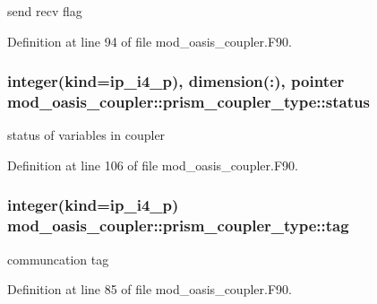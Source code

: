 send recv flag 



Definition at line 94 of file mod\+\_\+oasis\+\_\+coupler.\+F90.

\hypertarget{structmod__oasis__coupler_1_1prism__coupler__type_aee26373fa4a84f3c4e1841ba702f161c}{
\subsubsection[{status}]{\setlength{\rightskip}{0pt plus 5cm}integer(kind=ip\+\_\+i4\+\_\+p), dimension(\+:), pointer mod\+\_\+oasis\+\_\+coupler\+::prism\+\_\+coupler\+\_\+type\+::status\hspace{0.3cm}{\ttfamily [private]}}}\label{structmod__oasis__coupler_1_1prism__coupler__type_aee26373fa4a84f3c4e1841ba702f161c}


status of variables in coupler 



Definition at line 106 of file mod\+\_\+oasis\+\_\+coupler.\+F90.

\hypertarget{structmod__oasis__coupler_1_1prism__coupler__type_a3b8e0d2cd3f3001b4c82e7a911008a37}{
\subsubsection[{tag}]{\setlength{\rightskip}{0pt plus 5cm}integer(kind=ip\+\_\+i4\+\_\+p) mod\+\_\+oasis\+\_\+coupler\+::prism\+\_\+coupler\+\_\+type\+::tag\hspace{0.3cm}{\ttfamily [private]}}}\label{structmod__oasis__coupler_1_1prism__coupler__type_a3b8e0d2cd3f3001b4c82e7a911008a37}


communcation tag 



Definition at line 85 of file mod\+\_\+oasis\+\_\+coupler.\+F90.

